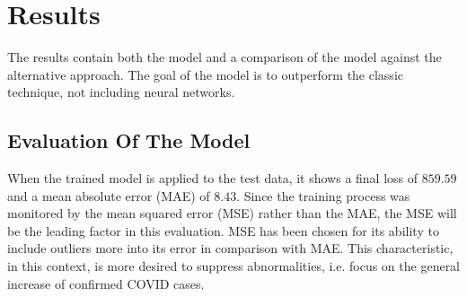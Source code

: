 \section{Results}
The results contain both the model and a comparison of the model against the alternative approach. The goal of the model is to outperform the classic technique, not including neural networks.
\subsection{Evaluation Of The Model} \label{sec:results_model}
When the trained model is applied to the test data, it shows a final loss of $859.59$ and a mean absolute error (MAE) of $8.43$. Since the training process was monitored by the mean squared error (MSE) rather than the MAE, the MSE will be the leading factor in this evaluation. MSE has been chosen for its ability to include outliers more into its error in comparison with MAE. This characteristic, in this context, is more desired to suppress abnormalities, i.e. focus on the general increase of confirmed COVID cases.
